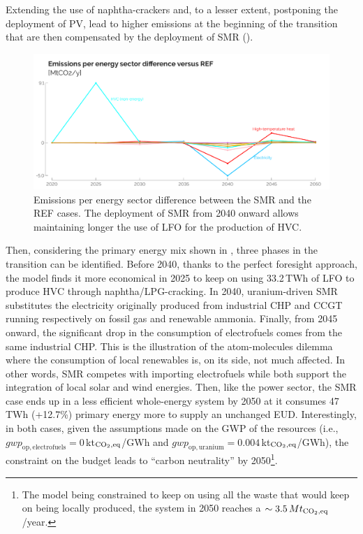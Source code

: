 \documentclass[11pt,twoside,a4paper,english]{article}
\def\ie{i.e.,}
\begin{document}
Extending the use of naphtha-crackers and, to a lesser extent, postponing the deployment of PV, lead to higher  emissions at the beginning of the transition that are then compensated by the deployment of \gls{SMR} (). 

\begin{figure}[htbp!]
\centering
\includegraphics[width=\textwidth]{GWP_per_sector_diff.pdf}
\caption{Emissions per energy sector difference between the SMR and the REF cases. The deployment of \gls{SMR} from 2040 onward allows maintaining longer the use of \acrfull{LFO} for the production of \acrfull{HVC}.}
\label{fig:GWP_per_sector_diff}
\end{figure}

\newpage
Then, considering the primary energy mix shown in , three phases in the transition can be identified. Before 2040, thanks to the perfect foresight approach, the model finds it more economical in 2025 to keep on using 33.2\,TWh of \gls{LFO} to produce \gls{HVC} through naphtha/LPG-cracking. In 2040, uranium-driven \gls{SMR} substitutes the electricity originally produced from industrial \gls{CHP} and \gls{CCGT} running respectively on fossil gas and renewable ammonia. Finally, from 2045 onward, the significant drop in the consumption of electrofuels comes from the same industrial \gls{CHP}. This is the illustration of the atom-molecules dilemma where the consumption of local renewables is, on its side, not much affected. In other words, \gls{SMR} competes with importing electrofuels while both support the integration of local solar and wind energies. Then, like the power sector, the SMR case ends up in a less efficient whole-energy system by 2050 at it consumes 47\,TWh (+12.7\%) primary energy more to supply an unchanged \gls{EUD}. Interestingly, in both cases, given the assumptions made on the \gls{GWP} of the resources (\ie $\mathit{gwp}_{\mathrm{op,electrofuels}}=0$\,kt$_{\ce{CO2},\text{eq}}$/GWh and $\mathit{gwp}_{\mathrm{op,uranium}}=0.004$\,kt$_{\ce{CO2},\text{eq}}$/GWh), the constraint on the  budget leads to ``carbon neutrality'' by 2050\footnote{The model being constrained to keep on using all the waste that would keep on being locally produced, the system in 2050 reaches a $\sim 3.5\,Mt_{\ce{CO2},\text{eq}}$/year.}.
\end{document}
